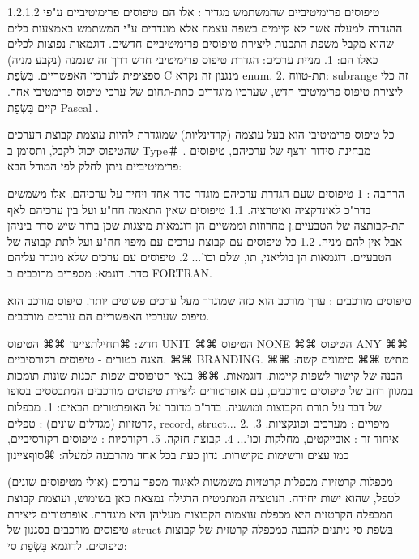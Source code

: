       1.2.1.2 טיפוסים פרימיטיביים שהמשתמש מגדיר :
      אלו הם טיפוסים פרימיטיביים ע"פי ההגדרה למעלה אשר לא קיימים בשפה עצמה אלא
      מוגדרים ע"י המשתמש באמצעות כלים שהוא מקבל משפת התכנות ליצירת טיפוסים
      פרימיטיביים חדשים. דוגמאות נפוצות לכלים כאלו הם:
      1. מניית ערכים: הגדרת טיפוס פרימיטיבי חדש דרך זה שנמנה (נקבע מניה) ספציפית לערכיו האפשריים. בִּשְׂפַת C מנגנון זה נקרא enum.
      2. תת-טווח: subrange זה כלי ליצירת טיפוס פרימיטיבי חדש, שערכיו מוגדרים כתת-תחום של ערכי טיפוס פרימטיבי אחר. קיים בִּשְׂפַת Pascal .

      כל טיפוס פרימיטיבי הוא בעל עוצמה (קרדינליות) שמוגדרת להיות עוצמת קבוצת הערכים שהטיפוס יכול לקבל, ותסומן ב Type＃ .
      מבחינת סידור ורצף של ערכיהם, טיפוסים פרימיטיביים ניתן לחלק לפי המודל הבא:

      הרחבה :
      1 טיפוסים שעם הגדרת ערכיהם מוגדר סדר אחד ויחיד על ערכיהם. אלו משמשים בדר"כ לאינדקציה ואיטרציה.
      1.1 טיפוסים שאין התאמה חח"ע ועל בין ערכיהם לאף תת-קבותצה של הטבעיים.ן מחרוזות וממשיים הן דוגמאות מיצגות שכן ברור שיש סדר ביניהן אבל אין להם מניה.
      1.2 כל טיפוסים עם קבוצת ערכים עם מיפוי חח"ע ועל לתת קבוצה של הטבעיים. דוגמאות הן בוליאני, תו, שלם וכו'...
      2. טיפוסים עם ערכים שלא מוגדר עליהם סדר. דוגמא: מספרים מרוכבים ב FORTRAN.

      טיפוסים מורכבים :
      ערך מורכב הוא כזה שמוגדר מעל ערכים פשוטים יותר. טיפוס מורכב הוא טיפוס שערכיו האפשריים הם ערכים מורכבים.

      חדש:
      ⌘תחילת{ציינון}
      ⌘⌘ הטיפוס UNIT
      ⌘⌘ הטיפוס NONE
      ⌘⌘ הטיפוס ANY
      ⌘⌘ הצגה כטורים - טיפוסים רקורסיביים.
      ⌘⌘ BRANDING.
      מתיש
      ⌘⌘ סימונים
      קשה:
      ⌘⌘ הבנה של קישור לשפות קיימות. דוגמאות.
      ⌘⌘ בנאי הטיפוסים
      שפות תכנות שונות תומכות במגוון רחב של טיפוסים מורכבים, עם אופרטורים ליצירת טיפוסים מורכבים המתבססים בסופו של דבר על תורת הקבוצות ומושגיה.
      בדר"כ מדובר על האופרטורים הבאים:
      1. מכפלות קרטזיות (מגדלים שונים) : טפלים, record, struct...
      2. מיפויים : מערכים ופונקציות.
      3. איחוד זר : אובייקטים, מחלקות וכו'...
      4. קבוצת חזקה.
      5. רקורסיות : טיפוסים רקורסיביים, כמו עצים ורשימות מקושרות.
      נדון כעת בכל אחד מהרבעה למעלה:
  ⌘סוף{ציינון}

      מכפלות קרטזיות
      מכפלות קרטזיות משמשות לאיגוד מספר ערכים (אולי מטיפוסים שונים) לטפל, שהוא ישות יחידה.
      הנוטציה המתמטית הרגילה נמצאת כאן בשימוש, ועוצמת קבוצת המכפלה הקרטזית היא מכפלת עוצמות הקבוצות מעליהן היא מוגדרת. אופרטורים ליצירת טיפוסים מורכבים בסגנון של struct בִּשְׂפַת סי ניתנים להבנה כמכפלה קרטזית של קבוצות טיפוסים. לדוגמא בִּשְׂפַת סי:

